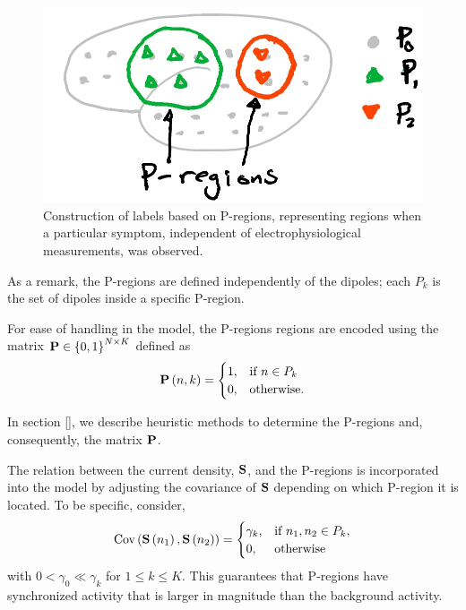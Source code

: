 \begin{figure}
    \centering 
    \includegraphics[width=0.6\linewidth]{./img_dev/Pregions.jpg}
    \caption{Construction of labels based on P-regions, representing regions when a particular symptom, independent of electrophysiological measurements, was observed.}
\end{figure}

As a remark, the P-regions are defined independently of the dipoles; each $P_k$ is the set of dipoles inside a specific P-region.

For ease of handling in the model, the P-regions regions are encoded using the matrix 
$\mathbf{P}\in \left\{ 0,1 \right\}^{N\times K}$ defined as
\begin{equation}
    \mathbf{P}\left( n,k \right) = \begin{cases}
        1, &\text{if } n \in P_k \\
        0, &\text{otherwise.}
    \end{cases}
\end{equation}

In section [], we describe heuristic methods to determine the P-regions and, consequently, the matrix $\mathbf{P}$.



The relation between the current density, $\mathbf{S}$, and the P-regions is incorporated into the model by adjusting the covariance of $\mathbf{S}$ depending on which P-region it is located.
%
To be specific, consider,
\begin{equation}
    \text{Cov}\left( \mathbf{S}\left( n_1 \right), \mathbf{S}\left( n_2 \right) \right) = 
    \begin{cases}
        \gamma_k, & \text{if } n_1, n_2\in P_k, \\
        0, & \text{otherwise}
    \end{cases}
\end{equation}
with $0 < \gamma_0 \ll \gamma_k$ for $1\leq k \leq K$.
%
This guarantees that P-regions have synchronized activity that is larger in magnitude than the background activity.

